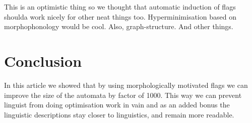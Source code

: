 \documentclass[11pt]{article}
\begin{document}
This is an optimistic thing so we thought that automatic induction of flags
shoulda work nicely for other neat things too. Hyperminimisation based on
morphophonology would be cool. Also, graph-structure. And other things.

\section{Conclusion}
\label{sec:conclusion}

In this article we showed that by using morphologically motivated flags we can
improve the size of the automata by factor of 1000. This way we can prevent
linguist from doing optimisation work in vain and as an added bonus the
linguistic descriptions stay closer to linguistics, and remain more readable.

\iffalse
\section*{Acknowledgments}

We thank our colleagues and we got funding.
\fi



\end{document}

